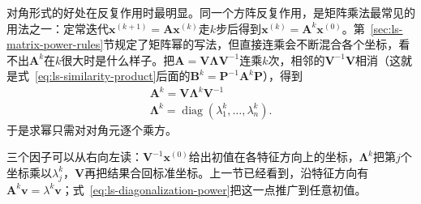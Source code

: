 对角形式的好处在反复作用时最明显。同一个方阵反复作用，是矩阵乘法最常见的用法之一：定常迭代$\bm x^{(k+1)}=\bm A\bm x^{(k)}$走$k$步后得到$\bm x^{(k)}=\bm A^k\bm x^{(0)}$。第~\ref{sec:ls-matrix-power-rules}节规定了矩阵幂的写法，但直接连乘会不断混合各个坐标，看不出$\bm A^k$在$k$很大时是什么样子。把$\bm A=\bm V\bm\Lambda\bm V^{-1}$连乘$k$次，相邻的$\bm V^{-1}\bm V$相消（这就是式~\eqref{eq:ls-similarity-product}后面的$\bm B^k=\bm P^{-1}\bm A^k\bm P$），得到
\begin{equation}
\begin{gathered}
\bm A^k=\bm V\bm\Lambda^k\bm V^{-1}\\
\bm\Lambda^k=\operatorname{diag}(\lambda_1^k,\ldots,\lambda_n^k).
\end{gathered}
\label{eq:ls-diagonalization-power}
\end{equation}
于是求幂只需对对角元逐个乘方。

三个因子可以从右向左读：$\bm V^{-1}\bm x^{(0)}$给出初值在各特征方向上的坐标，$\bm\Lambda^k$把第$j$个坐标乘以$\lambda_j^k$，$\bm V$再把结果合回标准坐标。上一节已经看到，沿特征方向有$\bm A^k\bm v=\lambda^k\bm v$；式~\eqref{eq:ls-diagonalization-power}把这一点推广到任意初值。

